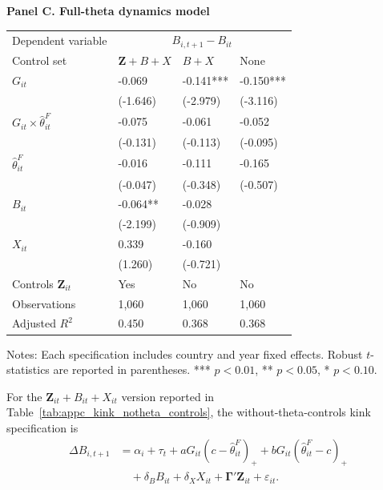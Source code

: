 \begin{table}[H]
\begin{threeparttable}
\vspace{0.35em}
\textbf{Panel C. Full-theta dynamics model}\\[0.45em]
\begin{tabularx}{\textwidth}{lYYY}
\toprule
Dependent variable &  \\
Control set & $\mathbf{Z}+B+X$ & $B+X$ & None \\
\midrule
$G_{it}$ & -0.069 & -0.141*** & -0.150*** \\
 & (-1.646) & (-2.979) & (-3.116) \\
$G_{it}\times\widehat{\theta}^{F}_{it}$ & -0.075 & -0.061 & -0.052 \\
 & (-0.131) & (-0.113) & (-0.095) \\
$\widehat{\theta}^{F}_{it}$ & -0.016 & -0.111 & -0.165 \\
 & (-0.047) & (-0.348) & (-0.507) \\
$B_{it}$ & -0.064** & -0.028 &  \\
 & (-2.199) & (-0.909) &  \\
$X_{it}$ & 0.339 & -0.160 &  \\
 & (1.260) & (-0.721) &  \\
\midrule
Controls $\mathbf{Z}_{it}$ & Yes & No & No \\
Observations & 1,060 & 1,060 & 1,060 \\
Adjusted $R^2$ & 0.450 & 0.368 & 0.368 \\
\bottomrule
\end{tabularx}
\begin{tablenotes}[flushleft]\footnotesize
\item Notes: Each specification includes country and year fixed effects. Robust $t$-statistics are reported in parentheses. *** $p<0.01$, ** $p<0.05$, * $p<0.10$.
\end{tablenotes}
\end{threeparttable}
\end{table}

For the $\mathbf{Z}_{it}+B_{it}+X_{it}$ version reported in Table~\ref{tab:appc_kink_notheta_controls}, the without-theta-controls kink specification is
\begin{equation}
\begin{aligned}
\Delta B_{i,t+1}
&=
\alpha_i+\tau_t
+aG_{it}(c-\widehat\theta^F_{it})_+
+bG_{it}(\widehat\theta^F_{it}-c)_+ \\
&\quad
+\delta_B B_{it}
+\delta_X X_{it}
+\boldsymbol{\Gamma}'\mathbf{Z}_{it}
+\varepsilon_{it}.
\end{aligned}
\label{eq:appc_kink_notheta_zbx}
\end{equation}

